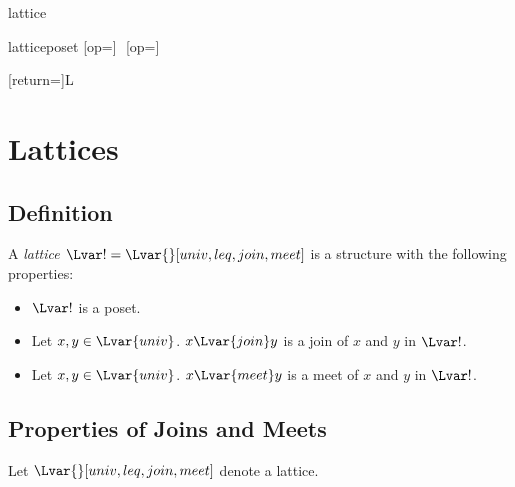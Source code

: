 \documentclass{stex}
\begin{document}
\begin{smodule}{lattice}

  \begin{extstructure}{lattice}{poset}
    [op=\vee]{\,\vee\,}
    [op=\wedge]{\,\wedge\,}
  \end{extstructure}

  [return={\lattice[comp=##1]}]{\mathcal L}

  \section{Lattices}

  \begin{forthel}
  \end{forthel}
  
  \subsection{Definition}

  \begin{forthel}
    \begin{signature*}
      A \emph{lattice $\Lvar! = \Lvar{}[univ,leq,join,meet]$} is a structure with the following properties:
      
      \begin{itemize}
        \item \label{latticeSig}
          $\Lvar!$ is a poset.
        
        \item \label{latticeJoinSig}
          Let $x, y \in \Lvar{univ}$.
          $x {\Lvar{join}} y$ is a join of $x$ and $y$ in $\Lvar!$.

        \item \label{latticeMeetSig}
          Let $x, y \in \Lvar{univ}$.
          $x {\Lvar{meet}} y$ is a meet of $x$ and $y$ in $\Lvar!$.
      \end{itemize}
    \end{signature*}
  \end{forthel}

  \subsection{Properties of Joins and Meets}

  \begin{forthel}
    Let $\Lvar{}[univ,leq,join,meet]$ denote a lattice.


\end{forthel}
\end{smodule}
\end{document}
